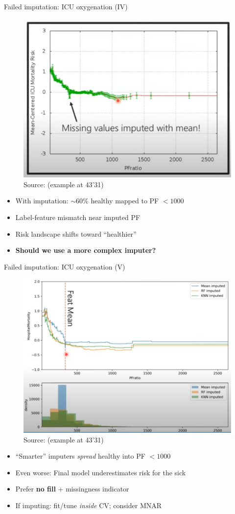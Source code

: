 \documentclass[11pt,compress,t,notes=noshow, xcolor=table]{beamer}
\begin{document}
\begin{frame}{Failed imputation: ICU oxygenation (IV)}
\begin{figure}
  \centering
  \includegraphics[width=0.6\linewidth]{figure_man/Screenshot from 2025-06-03 22-38-41.png}
  \\\scriptsize Source:  (example at 43'31)
\end{figure}
\begin{itemize}
  \item With imputation: \(\sim60\%\) healthy mapped to PF \(<1000\)
  \item Label-feature mismatch near imputed PF
  \item Risk landscape shifts toward “healthier”
  \item \textbf{Should we use a more complex imputer?}
\end{itemize}
\end{frame}

\begin{frame}{Failed imputation: ICU oxygenation (V)}
\begin{figure}
  \centering
  \includegraphics[width=0.66\linewidth]{figure_man/Screenshot from 2025-06-03 22-39-01.png}
  \\\scriptsize Source:  (example at 43'31)
\end{figure}
\begin{itemize}
  \item “Smarter” imputers \emph{spread} healthy into PF \(<1000\)
  \item Even worse: Final model underestimates risk for the sick
  \item Prefer \textbf{no fill} + missingness indicator
  \item If imputing: fit/tune \emph{inside} CV; consider MNAR
\end{itemize}
\end{frame}
\end{document}

